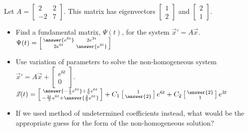 \documentclass{ximera}
\begin{document}
\begin{exercise}
    Let $A=\displaystyle \begin{bmatrix}2&2\\-2&7\end{bmatrix}$. This matrix has eigenvectors $\displaystyle \begin{bmatrix} 1 \\ 2 \end{bmatrix}$ and $\displaystyle \begin{bmatrix} 2 \\ 1 \end{bmatrix}$.
    \begin{itemize}
        \item Find a fundamental matrix, $\Psi(t)$, for the system $\vec{x}'=A\vec{x}$.\\
        $\Psi(t) = \left[\begin{smallmatrix} \answer{e^{6t}} & 2e^{3t} \\ 2e^{6t} & \answer{e^{3t}} \end{smallmatrix}\right]$
        \item Use variation of parameters to solve the non-homogeneous system $\vec{x}'=A\vec{x}+\displaystyle \begin{bmatrix}e^{6t} \\ 0 \end{bmatrix}$.\\
        $\vec{x}(t) = \left[\begin{smallmatrix} \answer{-\frac{t}{3}e^{6t}} + \frac{4}{9}e^{6t} \\ -\frac{2t}{3}e^{6t} + \answer{\frac{2}{9}e^{6t}} \end{smallmatrix}\right] + C_1\left[\begin{smallmatrix} 1 \\ \answer{2} \end{smallmatrix}\right]e^{6t} + C_2\left[\begin{smallmatrix} \answer{2} \\ 1 \end{smallmatrix}\right]e^{3t}$
        \item If we used method of undetermined coefficients instead, what would be the appropriate guess for the form of the non-homogeneous solution?
    \end{itemize}
\end{exercise}
\end{document}
